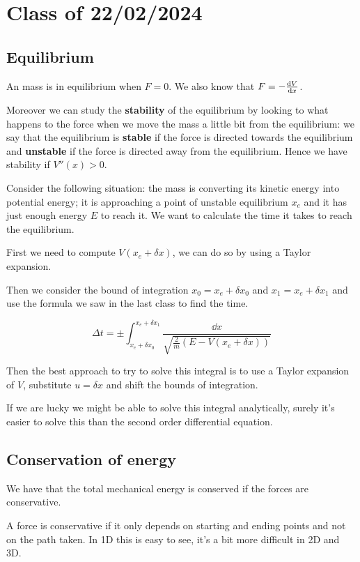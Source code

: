 \documentclass[10pt]{extarticle}
\begin{document}
\section{Class of 22/02/2024}

\subsection{Equilibrium}

An mass is in equilibrium when $F = 0$.
We also know that $F = -\dv{V}{x}$.

Moreover we can study the \textbf{stability} of the equilibrium by looking to what happens to the force when we move the mass a little bit from the equilibrium:
we say that the equilibrium is \textbf{stable} if the force is directed towards the equilibrium and \textbf{unstable} if the force is directed away from the equilibrium. Hence we have stability if $V''(x) > 0$.

Consider the following situation:
the mass is converting its kinetic energy into potential energy; it is approaching a point of unstable equilibrium $x_e$ and it has just enough energy $E$ to reach it.
We want to calculate the time it takes to reach the equilibrium.

First we need to compute $V(x_e + \delta x)$, we can do so by using a Taylor expansion.

Then we consider the bound of integration $x_0 = x_e + \delta x_0$ and $x_1 = x_e + \delta x_1$ and use the formula we saw in the last class to find the time.

$$
  \Delta t = \pm \int_{x_e + \delta x_0}^{x_e + \delta x_1} \frac{\dd{x}}{\sqrt{\frac{2}{m} (E - V(x_e + \delta x))}}
$$

Then the best approach to try to solve this integral is to use a Taylor expansion of $V$, substitute $u = \delta x$ and shift the bounds of integration.

If we are lucky we might be able to solve this integral analytically, surely it's easier to solve this than the second order differential equation.

\subsection{Conservation of energy}

We have that the total mechanical energy is conserved if the forces are conservative.

A force is conservative if it only depends on starting and ending points and not on the path taken. In 1D this is easy to see, it's a bit more difficult in 2D and 3D.
\end{document}
